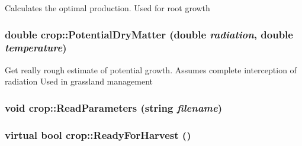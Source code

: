 \label{classcrop_a453298213a2fe4470677235a81e6d62a}
Calculates the optimal production. Used for root growth \hypertarget{classcrop_a0e9bb36caf25761c567dd2c59e3afccd}{
\subsubsection[{PotentialDryMatter}]{\setlength{\rightskip}{0pt plus 5cm}double crop::PotentialDryMatter (double {\em radiation}, \/  double {\em temperature})}}
\label{classcrop_a0e9bb36caf25761c567dd2c59e3afccd}
Get really rough estimate of potential growth. Assumes complete interception of radiation Used in grassland management \hypertarget{classcrop_af0b1a78d5cf3e32cf24c762e1dfb4048}{
\subsubsection[{ReadParameters}]{\setlength{\rightskip}{0pt plus 5cm}void crop::ReadParameters (string {\em filename})}}
\label{classcrop_af0b1a78d5cf3e32cf24c762e1dfb4048}
\hypertarget{classcrop_a8f2d5d0807fb0a81e50ea09e6df594ac}{
\subsubsection[{ReadyForHarvest}]{\setlength{\rightskip}{0pt plus 5cm}virtual bool crop::ReadyForHarvest ()}}
\label{classcrop_a8f2d5d0807fb0a81e50ea09e6df594ac}


